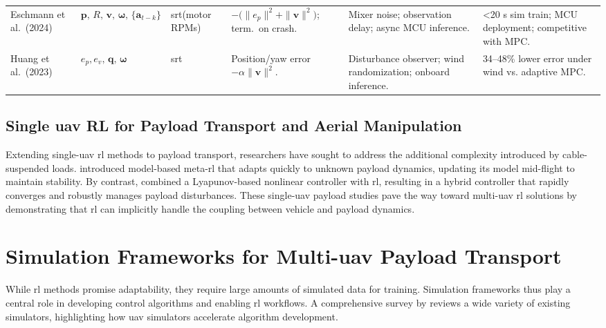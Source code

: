 \begin{table*}[!b]
\begin{tabular}{p{2.0cm}<{\raggedright} p{2.5cm}<{\raggedright} p{2.0cm}<{\raggedright} p{3.0cm}<{\raggedright} p{2.8cm}<{\raggedright} p{2.7cm}<{\raggedright}}
Eschmann et al.\ (2024) \cite{eschmann_learning_2024} & $\mathbf{p},\,R,\,\mathbf{v},\,\boldsymbol{\omega},\,\{\mathbf{a}_{t-k}\}$ & \gls{srt}(motor RPMs) & { $-\bigl(\|e_p\|^2 + \|\mathbf{v}\|^2\bigr)$; term.\ on crash.} & { Mixer noise; observation delay; async MCU inference.} & { <20 s sim train; MCU deployment; competitive with MPC.} \\[1ex]

Huang et al.\ (2023) \cite{huang_quadswarm_2023} & $e_p,e_v,\,\mathbf{q},\,\boldsymbol{\omega}$ & \gls{srt}& { Position/yaw error $- \alpha\|\mathbf{v}\|^2$.} & { Disturbance observer; wind randomization; onboard inference.} & { 34–48\% lower error under wind vs. adaptive MPC.} \\
\hline
\end{tabular}
\end{table*}

\subsection{Single \gls{uav} RL for Payload Transport and Aerial Manipulation}
Extending single-\gls{uav} \gls{rl} methods to payload transport, researchers have sought to address the additional complexity introduced by cable-suspended loads. \cite{belkhale_model-based_2021} introduced model-based meta-\gls{rl} that adapts quickly to unknown payload dynamics, updating its model mid-flight to maintain stability. By contrast, \cite{hua_new_2022} combined a Lyapunov-based nonlinear controller with \gls{rl}, resulting in a hybrid controller that rapidly converges and robustly manages payload disturbances. 
These single-\gls{uav} payload studies pave the way toward multi-\gls{uav} \gls{rl} solutions by demonstrating that \gls{rl} can implicitly handle the coupling between vehicle and payload dynamics.

\section{Simulation Frameworks for Multi-\gls{uav} Payload Transport}
While \gls{rl} methods promise adaptability, they require large amounts of simulated data for training. Simulation frameworks thus play a central role in developing control algorithms and enabling \gls{rl} workflows. A comprehensive survey by \cite{Dimmig2023SurveyOS} reviews a wide variety of existing simulators, highlighting how \gls{uav} simulators accelerate algorithm development.

